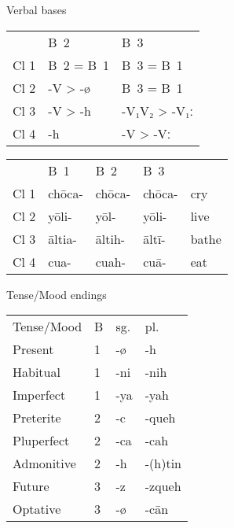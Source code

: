 \documentclass[12pt]{beamer}
\newcommand{\nah}[1]{\textcolor{nahgrn}{#1}}
\newcommand{\trs}[1]{\textcolor{nahblu}{#1}}
\begin{document}
\begin{frame}
\begin{columns}[t]
\begin{column}{.18\linewidth}
\begin{block}{Verbal bases}
\begin{tabular}{lll}
               & B~2           & B~3                \\
          Cl 1 & B~2 = B~1     & B~3 = B~1          \\
          Cl 2 & \nah{-V > -ø} & B~3 = B~1          \\
          Cl 3 & \nah{-V > -h} & \nah{-V₁V₂ > -V₁ː} \\
          Cl 4 & \nah{-h}      & \nah{-V > -Vː}
        \end{tabular}
      \end{block}
      \begin{example}
        \begin{tabular}{lllll}
               & B~1          & B~2          & B~3          &             \\
          Cl 1 & \nah{chōca-} & \nah{chōca-} & \nah{chōca-} & \trs{cry}   \\
          Cl 2 & \nah{yōli-}  & \nah{yōl-}   & \nah{yōli-}  & \trs{live}  \\
          Cl 3 & \nah{āltia-} & \nah{āltih-} & \nah{āltī-}  & \trs{bathe} \\
          Cl 4 & \nah{cua-}   & \nah{cuah-}  & \nah{cuā-}   & \trs{eat}
        \end{tabular}
      \end{example}
      \begin{block}{Tense/Mood endings}
        \begin{threeparttable}
          \begin{tabular}{llll}
            Tense/Mood  & B & sg.                & pl.                    \\
            Present     & 1 & \nah{-ø}           & \nah{-h}               \\
            Habitual    & 1 & \nah{-ni}\tnote{1} & \nah{-nih}\tnote{1}    \\
            Imperfect   & 1 & \nah{-ya}\tnote{2} & \nah{-yah}             \\
            Preterite   & 2 & \nah{-c}\tnote{3}  & \nah{-queh}            \\
            Pluperfect  & 2 & \nah{-ca}          & \nah{-cah}             \\
            Admonitive  & 2 & \nah{-h}\tnote{3}  & \nah{-(h)tin}\tnote{3} \\
            Future      & 3 & \nah{-z}           & \nah{-zqueh}           \\
            Optative    & 3 & \nah{-ø}           & \nah{-cān}             \\

\end{tabular}
\end{threeparttable}
\end{block}
\end{column}
\end{columns}
\end{frame}
\end{document}
